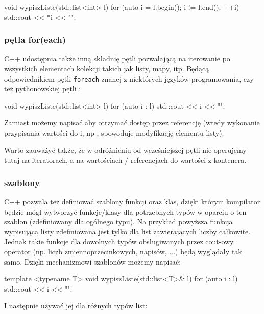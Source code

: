 \begin{CodeFrame*}[cpp]{}
void wypiszListe(std::list<int> l) {
    for (auto i = l.begin(); i != l.end(); ++i) {
        std::cout << *i << "\n";
    }
}
\end{CodeFrame*}

\subsubsection{pętla for(each)}

C++ udostępnia także inną składnię pętli  pozwalającą na iterowanie po wszystkich elementach kolekcji takich jak listy, mapy, itp. Będącą odpowiednikiem pętli \Verb#foreach# znanej z niektórych języków programowania, czy też pythonowskiej pętli :

\begin{CodeFrame*}[cpp]{}
void wypiszListe(std::list<int> l) {
    for (auto i : l) {
        std::cout << i << "\n";
    }
}
\end{CodeFrame*}

Zamiast  możemy napisać  aby otrzymać dostęp przez referencję (wtedy wykonanie przypisania wartości do i, np , spowoduje modyfikację elementu listy).

Warto zauważyć także, że w odróżnieniu od wcześniejszej pętli nie operujemy tutaj na iteratorach, a na wartościach / referencjach do wartości z kontenera.

\subsubsection{szablony}

C++ pozwala też definiować szablony funkcji oraz klas, dzięki którym kompilator będzie mógł wytworzyć funkcje/klasy dla potrzebnych typów w oparciu o ten szablon (zdefiniowany dla ogólnego typu).
Na przykład powyższa funkcja wypisująca listy zdefiniowana jest tylko dla list zawierających liczby całkowite.
Jednak takie funkcje dla dowolnych typów obsługiwanych przez cout-owy operator \cpp{<<} (np. liczb zmiennoprzecinkowych, napisów, ...) będą wyglądały tak samo.
Dzięki mechanizmowi szablonów możemy napisać:

\begin{CodeFrame*}[cpp]{}
template <typename T> void wypiszListe(std::list<T>& l) {
    for (auto i : l) {
        std::cout << i << "\n";
    }
}
\end{CodeFrame*}

I następnie używać jej dla różnych typów list:

